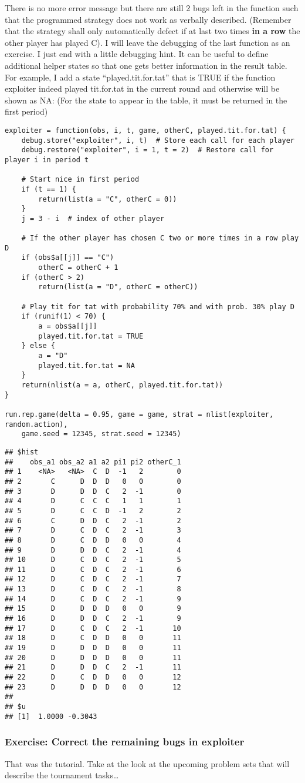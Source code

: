 \documentclass[]{article}
\begin{document}
There is no more error message but there are still 2 bugs left in the
function such that the programmed strategy does not work as verbally
described. (Remember that the strategy shall only automatically defect
if at last two times \textbf{in a row} the other player has played C). I
will leave the debugging of the last function as an exercise. I just end
with a little debugging hint. It can be useful to define additional
helper states so that one gets better information in the result table.
For example, I add a state ``played.tit.for.tat'' that is TRUE if the
function exploiter indeed played tit.for.tat in the current round and
otherwise will be shown as NA: (For the state to appear in the table, it
must be returned in the first period)

\begin{verbatim}
exploiter = function(obs, i, t, game, otherC, played.tit.for.tat) {
    debug.store("exploiter", i, t)  # Store each call for each player
    debug.restore("exploiter", i = 1, t = 2)  # Restore call for player i in period t

    # Start nice in first period
    if (t == 1) {
        return(list(a = "C", otherC = 0))
    }
    j = 3 - i  # index of other player

    # If the other player has chosen C two or more times in a row play D
    if (obs$a[[j]] == "C") 
        otherC = otherC + 1
    if (otherC > 2) 
        return(list(a = "D", otherC = otherC))

    # Play tit for tat with probability 70% and with prob. 30% play D
    if (runif(1) < 70) {
        a = obs$a[[j]]
        played.tit.for.tat = TRUE
    } else {
        a = "D"
        played.tit.for.tat = NA
    }
    return(nlist(a = a, otherC, played.tit.for.tat))
}

run.rep.game(delta = 0.95, game = game, strat = nlist(exploiter, random.action), 
    game.seed = 12345, strat.seed = 12345)
\end{verbatim}

\begin{verbatim}
## $hist
##    obs_a1 obs_a2 a1 a2 pi1 pi2 otherC_1
## 1    <NA>   <NA>  C  D  -1   2        0
## 2       C      D  D  D   0   0        0
## 3       D      D  D  C   2  -1        0
## 4       D      C  C  C   1   1        1
## 5       D      C  C  D  -1   2        2
## 6       C      D  D  C   2  -1        2
## 7       D      C  D  C   2  -1        3
## 8       D      C  D  D   0   0        4
## 9       D      D  D  C   2  -1        4
## 10      D      C  D  C   2  -1        5
## 11      D      C  D  C   2  -1        6
## 12      D      C  D  C   2  -1        7
## 13      D      C  D  C   2  -1        8
## 14      D      C  D  C   2  -1        9
## 15      D      D  D  D   0   0        9
## 16      D      D  D  C   2  -1        9
## 17      D      C  D  C   2  -1       10
## 18      D      C  D  D   0   0       11
## 19      D      D  D  D   0   0       11
## 20      D      D  D  D   0   0       11
## 21      D      D  D  C   2  -1       11
## 22      D      C  D  D   0   0       12
## 23      D      D  D  D   0   0       12
## 
## $u
## [1]  1.0000 -0.3043
\end{verbatim}

\subsubsection{Exercise: Correct the remaining bugs in exploiter}

That was the tutorial. Take at the look at the upcoming problem sets
that will describe the tournament tasks\ldots{}
\end{document}
